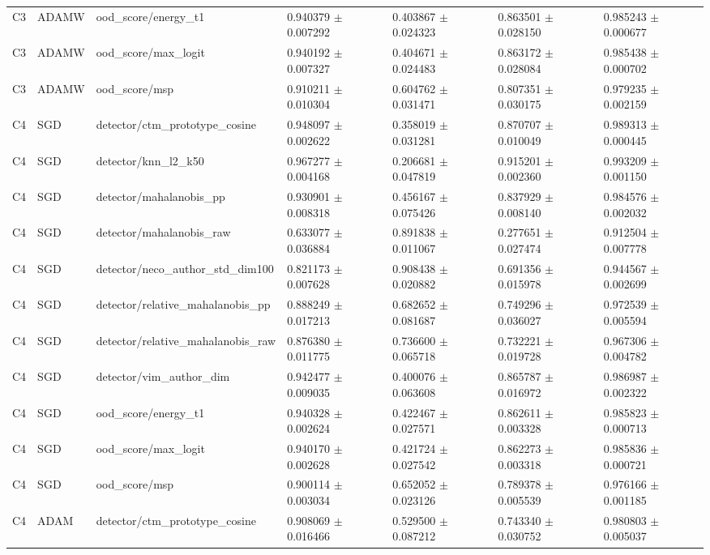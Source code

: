 \begin{longtable}{lllllll}
C3 & ADAMW & ood\_score/energy\_t1 & 0.940379 $\pm$ 0.007292 & 0.403867 $\pm$ 0.024323 & 0.863501 $\pm$ 0.028150 & 0.985243 $\pm$ 0.000677 \\
C3 & ADAMW & ood\_score/max\_logit & 0.940192 $\pm$ 0.007327 & 0.404671 $\pm$ 0.024483 & 0.863172 $\pm$ 0.028084 & 0.985438 $\pm$ 0.000702 \\
C3 & ADAMW & ood\_score/msp & 0.910211 $\pm$ 0.010304 & 0.604762 $\pm$ 0.031471 & 0.807351 $\pm$ 0.030175 & 0.979235 $\pm$ 0.002159 \\
C4 & SGD & detector/ctm\_prototype\_cosine & 0.948097 $\pm$ 0.002622 & 0.358019 $\pm$ 0.031281 & 0.870707 $\pm$ 0.010049 & 0.989313 $\pm$ 0.000445 \\
C4 & SGD & detector/knn\_l2\_k50 & 0.967277 $\pm$ 0.004168 & 0.206681 $\pm$ 0.047819 & 0.915201 $\pm$ 0.002360 & 0.993209 $\pm$ 0.001150 \\
C4 & SGD & detector/mahalanobis\_pp & 0.930901 $\pm$ 0.008318 & 0.456167 $\pm$ 0.075426 & 0.837929 $\pm$ 0.008140 & 0.984576 $\pm$ 0.002032 \\
C4 & SGD & detector/mahalanobis\_raw & 0.633077 $\pm$ 0.036884 & 0.891838 $\pm$ 0.011067 & 0.277651 $\pm$ 0.027474 & 0.912504 $\pm$ 0.007778 \\
C4 & SGD & detector/neco\_author\_std\_dim100 & 0.821173 $\pm$ 0.007628 & 0.908438 $\pm$ 0.020882 & 0.691356 $\pm$ 0.015978 & 0.944567 $\pm$ 0.002699 \\
C4 & SGD & detector/relative\_mahalanobis\_pp & 0.888249 $\pm$ 0.017213 & 0.682652 $\pm$ 0.081687 & 0.749296 $\pm$ 0.036027 & 0.972539 $\pm$ 0.005594 \\
C4 & SGD & detector/relative\_mahalanobis\_raw & 0.876380 $\pm$ 0.011775 & 0.736600 $\pm$ 0.065718 & 0.732221 $\pm$ 0.019728 & 0.967306 $\pm$ 0.004782 \\
C4 & SGD & detector/vim\_author\_dim & 0.942477 $\pm$ 0.009035 & 0.400076 $\pm$ 0.063608 & 0.865787 $\pm$ 0.016972 & 0.986987 $\pm$ 0.002322 \\
C4 & SGD & ood\_score/energy\_t1 & 0.940328 $\pm$ 0.002624 & 0.422467 $\pm$ 0.027571 & 0.862611 $\pm$ 0.003328 & 0.985823 $\pm$ 0.000713 \\
C4 & SGD & ood\_score/max\_logit & 0.940170 $\pm$ 0.002628 & 0.421724 $\pm$ 0.027542 & 0.862273 $\pm$ 0.003318 & 0.985836 $\pm$ 0.000721 \\
C4 & SGD & ood\_score/msp & 0.900114 $\pm$ 0.003034 & 0.652052 $\pm$ 0.023126 & 0.789378 $\pm$ 0.005539 & 0.976166 $\pm$ 0.001185 \\
C4 & ADAM & detector/ctm\_prototype\_cosine & 0.908069 $\pm$ 0.016466 & 0.529500 $\pm$ 0.087212 & 0.743340 $\pm$ 0.030752 & 0.980803 $\pm$ 0.005037 \\

\end{longtable}
